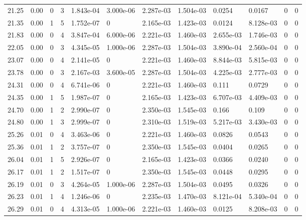 \documentclass[preview]{standalone}
\begin{document}
{{{\begin{tabular}{L{1.2cm}C{1.2cm} C{0.3cm}C{0.5cm} C{1.4cm}C{1.4cm} C{1.4cm}C{1.4cm} C{1.6cm}C{1.6cm} C{1.6cm}C{1.6cm}}
  21.25  &  0.00  & 0     &  3 &  1.843e-04  & 3.000e-06  &  2.287e-03&   1.504e-03& 0.0254 & 0.0167   &  0 & 0  \\ 
  21.35  &  0.00  & 1     &  5 &  1.752e-07  & 0  &  2.165e-03&   1.423e-03& 0.0124 & 8.128e-03   &  0 & 0  \\ 
  21.83  &  0.00  & 0     &  4 &  3.847e-04  & 6.000e-06  &  2.221e-03&   1.460e-03& 2.655e-03 & 1.746e-03   &  0 & 0  \\ 
  22.05  &  0.00  & 0     &  3 &  4.345e-05  & 1.000e-06  &  2.287e-03&   1.504e-03& 3.890e-04 & 2.560e-04   &  0 & 0  \\ 
  23.07  &  0.00  & 0     &  4 &  2.141e-05  & 0  &  2.221e-03&   1.460e-03& 8.844e-03 & 5.815e-03   &  0 & 0  \\ 
  23.78  &  0.00  & 0     &  3 &  2.167e-03  & 3.600e-05  &  2.287e-03&   1.504e-03& 4.225e-03 & 2.777e-03   &  0 & 0  \\ 
  24.31  &  0.00  & 0     &  4 &  6.741e-06  & 0  &  2.221e-03&   1.460e-03& 0.111 & 0.0729   &  0 & 0  \\ 
  24.35  &  0.00  & 1     &  5 &  1.987e-07  & 0  &  2.165e-03&   1.423e-03& 6.707e-03 & 4.409e-03   &  0 & 0  \\ 
  24.70  &  0.00  & 1     &  2 &  2.990e-07  & 0  &  2.350e-03&   1.545e-03& 0.166 & 0.109   &  0 & 0  \\ 
  24.80  &  0.00  & 1     &  3 &  2.999e-07  & 0  &  2.310e-03&   1.519e-03& 5.217e-03 & 3.430e-03   &  0 & 0  \\ 
  25.26  &  0.01  & 0     &  4 &  3.463e-06  & 0  &  2.221e-03&   1.460e-03& 0.0826 & 0.0543   &  0 & 0  \\ 
  25.36  &  0.01  & 1     &  2 &  3.757e-07  & 0  &  2.350e-03&   1.545e-03& 0.0404 & 0.0265   &  0 & 0  \\ 
  26.04  &  0.01  & 1     &  5 &  2.926e-07  & 0  &  2.165e-03&   1.423e-03& 0.0366 & 0.0240   &  0 & 0  \\ 
  26.17  &  0.01  & 1     &  2 &  1.517e-07  & 0  &  2.350e-03&   1.545e-03& 0.0448 & 0.0295   &  0 & 0  \\ 
  26.19  &  0.01  & 0     &  3 &  4.264e-05  & 1.000e-06  &  2.287e-03&   1.504e-03& 0.0495 & 0.0326   &  0 & 0  \\ 
  26.23  &  0.01  & 1     &  4 &  1.246e-06  & 0  &  2.235e-03&   1.470e-03& 8.121e-04 & 5.340e-04   &  0 & 0  \\ 
  26.29  &  0.01  & 0     &  4 &  4.313e-05  & 1.000e-06  &  2.221e-03&   1.460e-03& 0.0125 & 8.208e-03   &  0 & 0  \\ 

\end{tabular}}}}
\end{document}
